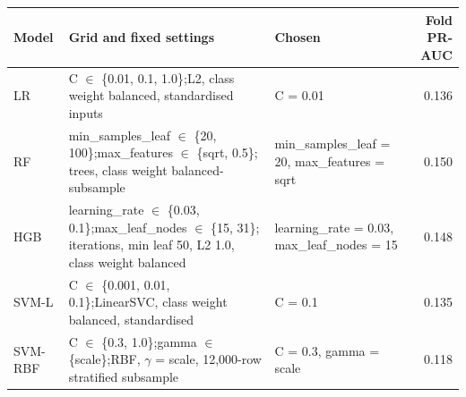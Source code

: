\begin{tabular}{p{0.8cm}p{3.0cm}p{1.95cm}r}
\toprule
Model & Grid and fixed settings & Chosen & Fold PR-AUC \\
\midrule
LR & C $\in$ \{0.01, 0.1, 1.0\};\newline L2, class weight balanced, standardised inputs & C = 0.01 & 0.136 \\
RF & min\_samples\_leaf $\in$ \{20, 100\};\newline max\_features $\in$ \{sqrt, 0.5\};\newline 300 trees, class weight balanced-subsample & min\_samples\_leaf = 20, max\_features = sqrt & 0.150 \\
HGB & learning\_rate $\in$ \{0.03, 0.1\};\newline max\_leaf\_nodes $\in$ \{15, 31\};\newline 300 iterations, min leaf 50, L2 1.0, class weight balanced & learning\_rate = 0.03, max\_leaf\_nodes = 15 & 0.148 \\
SVM-L & C $\in$ \{0.001, 0.01, 0.1\};\newline LinearSVC, class weight balanced, standardised & C = 0.1 & 0.135 \\
SVM-RBF & C $\in$ \{0.3, 1.0\};\newline gamma $\in$ \{scale\};\newline RBF, $\gamma$ = scale, 12,000-row stratified subsample & C = 0.3, gamma = scale & 0.118 \\
\bottomrule
\end{tabular}
